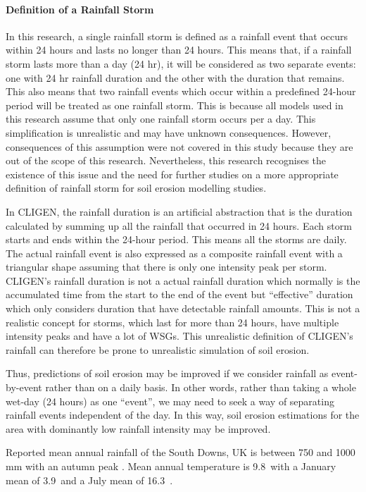 \paragraph{Definition of a Rainfall Storm} In this research, a single rainfall
storm is defined as a rainfall event that occurs within 24 hours and lasts no
longer than 24 hours. This means that, if a rainfall storm lasts more than a day
(24 hr), it will be considered as two separate events: one with 24 hr rainfall
duration and the other with the duration that remains. This also means that two
rainfall events which occur within a predefined 24-hour period will be treated
as one rainfall storm. This is because all models used in this research assume
that only one rainfall storm occurs per a day. This simplification is
unrealistic and may have unknown consequences. However, consequences of this
assumption were not covered in this study because they are out of the scope of
this research. Nevertheless, this research recognises the existence of this
issue and the need for further studies on a more appropriate definition of
rainfall storm for soil erosion modelling studies.

In CLIGEN, the rainfall duration is an artificial abstraction that is the
duration calculated by summing up all the rainfall that occurred in 24 hours.
Each storm starts and ends within the 24-hour period. This means all
the storms are daily. The actual rainfall event is also expressed as a composite
rainfall event with a triangular shape assuming that there is only one
intensity peak per storm. CLIGEN's rainfall duration is not a actual rainfall
duration which normally is the accumulated time from the start to the end of the
event but ``effective'' duration which only considers duration that have
detectable rainfall amounts. This is not a realistic concept for storms, which
last for more than 24 hours, have multiple intensity peaks and have a lot of
WSGs. This unrealistic definition of CLIGEN's rainfall can therefore be prone to
unrealistic simulation of soil erosion.

Thus, predictions of soil erosion may be improved if we consider rainfall as
event-by-event rather than on a daily basis. In other words, rather than taking
a whole wet-day (24 hours) as one ``event'', we may need to seek a way of
separating rainfall events independent of the day. In this way, soil erosion
estimations for the area with dominantly low rainfall intensity may be improved.

Reported mean annual rainfall of the South Downs, UK is between 750 and 1000 mm
with an autumn peak \citep{potts1983-88}. Mean annual temperature is
9.8\textcelsius\ with a January mean of 3.9\textcelsius\ and a July mean of
16.3\textcelsius\ \citep{potts1983-88}.

